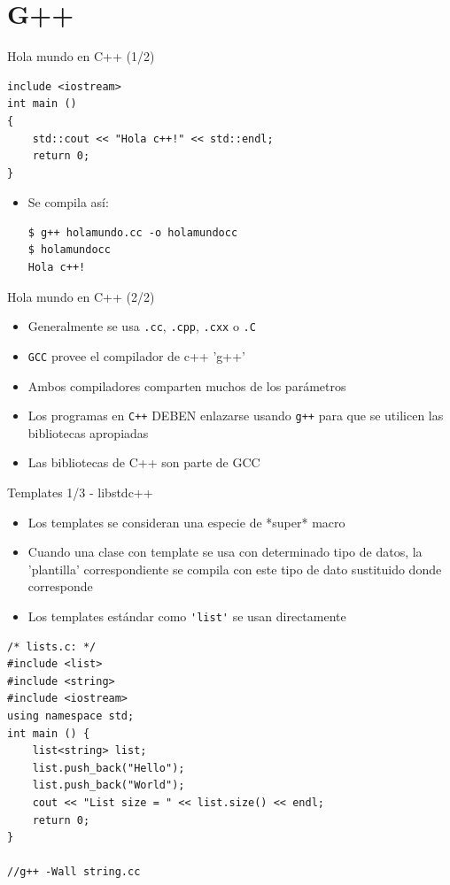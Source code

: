 \documentclass[xetex]{beamer}
\begin{document}
\section{G++}


\begin{frame}[fragile]{Hola mundo en C++ (1/2)}
  
\begin{lstlisting}
include <iostream>
int main ()
{
    std::cout << "Hola c++!" << std::endl;
    return 0;
}
\end{lstlisting}

\begin{itemize}
  \item Se compila así:
\begin{verbatim}
$ g++ holamundo.cc -o holamundocc
$ holamundocc
Hola c++!
\end{verbatim}
\end{itemize}

\end{frame}

\begin{frame}[fragile]{Hola mundo en C++ (2/2)}
\begin{itemize}
  \item Generalmente se usa \verb=.cc=, \verb=.cpp=, \verb=.cxx= o \verb=.C=
  \item \verb=GCC= provee el compilador de c++ 'g++'
  \item Ambos compiladores comparten muchos de los parámetros
  \item Los programas en \verb=C++= DEBEN enlazarse usando \verb=g++= para que se utilicen las bibliotecas apropiadas
  \item Las bibliotecas de C++ son parte de GCC
\end{itemize}  
\end{frame}

\begin{frame}[fragile]{Templates 1/3 - libstdc++}
\begin{itemize}
  \item Los templates se consideran una especie de *super* macro
  \item Cuando una clase con template se usa con determinado tipo de datos, la 'plantilla' correspondiente se compila con este tipo de dato sustituido donde corresponde
  \item Los templates estándar como \verb='list'= se usan directamente
\end{itemize}
\begin{lstlisting}
/* lists.c: */
#include <list>
#include <string>
#include <iostream>
using namespace std;
int main () {
    list<string> list;
    list.push_back("Hello");
    list.push_back("World");
    cout << "List size = " << list.size() << endl;
    return 0;
}

//g++ -Wall string.cc
\end{lstlisting}
\end{frame}
\end{document}
